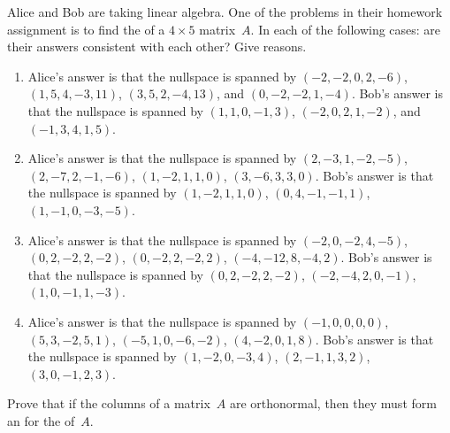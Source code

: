 \begin{exercise} \label{ex:} 
Alice and Bob are taking linear algebra. 
One of the problems in their homework assignment is to find the  of a \(4\times5\) matrix~\(A\). 
In each of the following cases: are their answers consistent with each other?
Give reasons.
\begin{enumerate} \sloppy
\item Alice's answer is that the nullspace is spanned by 
\((-2, -2, 0, 2, -6)\), \((1, 5, 4, -3, 11)\), \((3, 5, 2, -4, 13)\), and \((0, -2, -2, 1, -4)\). 
Bob's answer is that the nullspace is spanned by 
\((1, 1, 0, -1, 3)\), \((-2, 0, 2, 1, -2)\), and \((-1, 3, 4, 1, 5)\). 

\item Alice's answer is that the nullspace is spanned by 
\((2,-3,1,-2,-5)\), 
\((2,-7,2,-1,-6)\), 
\((1,-2,1,1,0)\), 
\((3,-6,3,3,0)\). 
Bob's answer is that the nullspace is spanned by 
\((1,-2,1,1,0)\), 
\((0,4,-1,-1,1)\), 
\((1,-1,0,-3,-5)\). 

\item Alice's answer is that the nullspace is spanned by 
\((-2,0,-2,4,-5)\), 
\((0,2,-2,2,-2)\), 
\((0,-2,2,-2,2)\), 
\((-4,-12,8,-4,2)\). 
Bob's answer is that the nullspace is spanned by 
\((0,2,-2,2,-2)\), 
\((-2,-4,2,0,-1)\), 
\((1,0,-1,1,-3)\). 

\item Alice's answer is that the nullspace is spanned by 
\((-1,0,0,0,0)\), 
\((5,3,-2,5,1)\), 
\((-5,1,0,-6,-2)\), 
\((4,-2,0,1,8)\). 
Bob's answer is that the nullspace is spanned by 
\((1,-2,0,-3,4)\), 
\((2,-1,1,3,2)\), 
\((3,0,-1,2,3)\). 

\end{enumerate}
\end{exercise}










\begin{exercise} \label{ex:} 
Prove that if the columns of a matrix~\(A\) are orthonormal, then they must form an  for the  of~\(A\).
\end{exercise}




